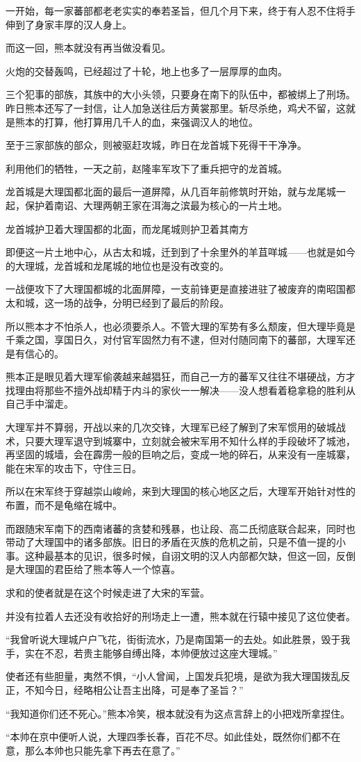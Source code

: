 一开始，每一家蕃部都老老实实的奉若圣旨，但几个月下来，终于有人忍不住将手伸到了身家丰厚的汉人身上。

而这一回，熊本就没有再当做没看见。

火炮的交替轰鸣，已经超过了十轮，地上也多了一层厚厚的血肉。

三个犯事的部族，其族中的大小头领，只要身在南下的队伍中，都被绑上了刑场。昨日熊本还写了一封信，让人加急送往后方黄裳那里。斩尽杀绝，鸡犬不留，这就是熊本的打算，他打算用几千人的血，来强调汉人的地位。

至于三家部族的部众，则被驱赶攻城，昨日在龙首城下死得干干净净。

利用他们的牺牲，一天之前，赵隆率军攻下了重兵把守的龙首城。

龙首城是大理国都北面的最后一道屏障，从几百年前修筑时开始，就与龙尾城一起，保护着南诏、大理两朝王家在洱海之滨最为核心的一片土地。

龙首城护卫着大理国都的北面，而龙尾城则护卫着其南方

即便这一片土地中心，从古太和城，迁到到了十余里外的羊苴咩城——也就是如今的大理城，龙首城和龙尾城的地位也是没有改变的。

一战便攻下了大理国都城的北面屏障，一支前锋更是直接进驻了被废弃的南昭国都太和城，这一场的战争，分明已经到了最后的阶段。

所以熊本才不怕杀人，也必须要杀人。不管大理的军势有多么颓废，但大理毕竟是千乘之国，享国日久，对付官军固然力有不逮，但对付随同南下的蕃部，大理军还是有信心的。

熊本正是眼见着大理军偷袭越来越猖狂，而自己一方的蕃军又往往不堪硬战，方才找理由将那些不擅外战却精于内斗的家伙一一解决——没人想看着稳拿稳的胜利从自己手中溜走。

大理军并不算弱，开战以来的几次交锋，大理军已经了解到了宋军惯用的破城战术，只要大理军退守到城寨中，立刻就会被宋军用不知什么样的手段破坏了城池，再坚固的城墙，会在霹雳一般的巨响之后，变成一地的碎石，从来没有一座城寨，能在宋军的攻击下，守住三日。

所以在宋军终于穿越崇山峻岭，来到大理国的核心地区之后，大理军开始针对性的布置，而不是龟缩在城中。

而跟随宋军南下的西南诸蕃的贪婪和残暴，也让段、高二氏彻底联合起来，同时也带动了大理国中的诸多部族。旧日的矛盾在灭族的危机之前，只是不值一提的小事。这种最基本的见识，很多时候，自诩文明的汉人内部都欠缺，但这一回，反倒是大理国的君臣给了熊本等人一个惊喜。

求和的使者就是在这个时候走进了大宋的军营。

并没有拉着人去还没有收拾好的刑场走上一遭，熊本就在行辕中接见了这位使者。

“我曾听说大理城户户飞花，街街流水，乃是南国第一的去处。如此胜景，毁于我手，实在不忍，若贵主能够自缚出降，本帅便放过这座大理城。”

使者还有些胆量，夷然不惧，“小人曾闻，上国发兵犯境，是欲为我大理国拨乱反正，不知今日，经略相公让吾主出降，可是奉了圣旨？”

“我知道你们还不死心。”熊本冷笑，根本就没有为这点言辞上的小把戏所拿捏住。

“本帅在京中便听人说，大理四季长春，百花不尽。如此佳处，既然你们都不在意，那么本帅也只能先拿下再去在意了。”
